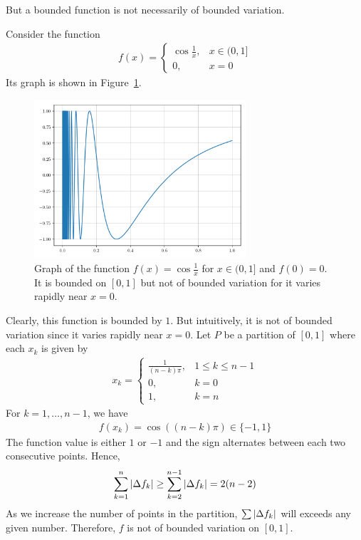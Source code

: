 \documentclass[thmcnt=section, color=blue, 12pt]{my-elegantbook}
\begin{document}
But a bounded function is not necessarily of bounded variation.

\begin{example} \label{eg:1}
	Consider the function
	\begin{align*}
		f(x) = \begin{cases}
			       \cos \frac{1}{x}, & x \in (0, 1] \\
			       0,                & x = 0
		       \end{cases}
	\end{align*}
	Its graph is shown in Figure~\ref{fig:1}.
	\begin{figure}[H]
		\centering
		\includegraphics[width=0.7\textwidth]{figures/bounded-function-that-is-not-of-bounded-variation.png}
		\caption{Graph of the function $f(x) = \cos\frac{1}{x}$ for $x \in (0, 1]$ and $f(0) = 0$. It is bounded on $[0, 1]$ but not of bounded variation for it varies rapidly near $x=0$.}
		\label{fig:1}
	\end{figure}
	Clearly, this function is bounded by $1$.
	But intuitively, it is not of bounded variation since it varies rapidly
	near $x=0$.
	Let $P$ be a partition of $[0, 1]$ where each $x_k$ is given by
	\begin{align*}
		x_k = \begin{cases}
			      \frac{1}{(n-k) \pi}, & 1 \leq k \leq n-1 \\
			      0,                   & k = 0             \\
			      1,                   & k = n
		      \end{cases}
	\end{align*}
	For $k=1, \dots, n-1$, we have
	\begin{align*}
		f(x_k) = \cos ( (n-k) \pi ) \in \{-1, 1\}
	\end{align*}
	The function value is either $1$ or $-1$ and the sign alternates between
	each two consecutive points. Hence,
	\begin{align*}
		\sum_{k=1}^{n} \left\lvert \Delta f_k \right\rvert
		\geq \sum_{k=2}^{n-1} \left\lvert \Delta f_k \right\rvert = 2 (n - 2)
	\end{align*}
	As we increase the number of points in the partition, $\sum \left\lvert \Delta f_k \right\rvert$
	will exceeds any given number.
	Therefore, $f$ is not of bounded variation on $[0, 1]$.
\end{example}
\end{document}
